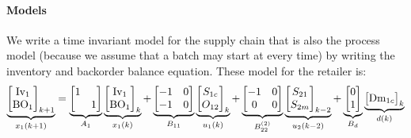 \paragraph{Models}
We write a  time invariant model  for the supply chain that is also the
 process model (because we assume that a batch may start at every
 time) by writing the inventory and backorder balance equation. These
 model for the retailer is:
\begin{equation}
\label{eq:sc:scheduling_example:R}
\underbrace{\begin{bmatrix}\textrm{Iv}_1\\\textrm{BO}_1\end{bmatrix}_{k+1}}_{x_1(k+1)} =
\underbrace{\begin{bmatrix}1&\\ &
    1\end{bmatrix}}_{A_1}\underbrace{\begin{bmatrix}\textrm{Iv}_1\\\textrm{BO}_1\end{bmatrix}_k}_{x_1(k)}
+\underbrace{\begin{bmatrix}-1 & 0 \\-1&
    0 \end{bmatrix}}_{B_{11}}\underbrace{\begin{bmatrix}S_{1c}\\O_{12}\end{bmatrix}_k}_{u_1(k)}
+\underbrace{\begin{bmatrix}-1 & 0 \\0&
    0 \end{bmatrix}}_{B_{22}^{(2)}}\underbrace{\begin{bmatrix}S_{21}\\S_{2m}\end{bmatrix}_{k-2}}_{u_2(k-2)}
+\underbrace{\begin{bmatrix} 0\\1\end{bmatrix}}_{B_d}\underbrace{\begin{bmatrix}\textrm{Dm}_{1c}\end{bmatrix}_{k}}_{d(k)}
\end{equation}

